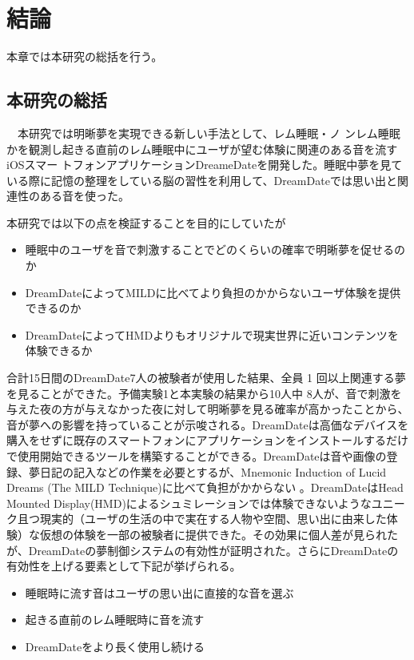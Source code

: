 \chapter{結論}
\label{chap:coding}

本章では本研究の総括を行う。
\section{本研究の総括}
　本研究では明晰夢を実現できる新しい手法として、レム睡眠・ノ ンレム睡眠かを観測し起きる直前のレム睡眠中にユーザが望む体験に関連のある音を流すiOSスマー トフォンアプリケーションDreameDateを開発した。睡眠中夢を見ている際に記憶の整理をしている脳の習性を利用して、DreamDateでは思い出と関連性のある音を使った。

本研究では以下の点を検証することを目的にしていたが
\begin{itemize}
\item 睡眠中のユーザを音で刺激することでどのくらいの確率で明晰夢を促せるのか
\item DreamDateによってMILDに比べてより負担のかからないユーザ体験を提供できるのか
\item DreamDateによってHMDよりもオリジナルで現実世界に近いコンテンツを体験できるか
\end{itemize}

合計15日間のDreamDate7人の被験者が使用した結果、全員 1 回以上関連する夢を見ることができた。予備実験1と本実験の結果から10人中 8人が、音で刺激を与えた夜の方が与えなかった夜に対して明晰夢を見る確率が高かったことから、音が夢への影響を持っていることが示唆される。DreamDateは高価なデバイスを購入をせずに既存のスマートフォンにアプリケーションをインストールするだけで使用開始できるツールを構築することができる。DreamDateは音や画像の登録、夢日記の記入などの作業を必要とするが、Mnemonic Induction of Lucid Dreams (The MILD Technique)に比べて負担がかからない\cite{LaBerge} 。DreamDateはHead Mounted Display(HMD)によるシュミレーションでは体験できないようなユニーク且つ現実的（ユーザの生活の中で実在する人物や空間、思い出に由来した体験）な仮想の体験を一部の被験者に提供できた。その効果に個人差が見られたが、DreamDateの夢制御システムの有効性が証明された。さらにDreamDateの有効性を上げる要素として下記が挙げられる。

\begin{itemize}
\item 睡眠時に流す音はユーザの思い出に直接的な音を選ぶ
\item 起きる直前のレム睡眠時に音を流す
\item DreamDateをより長く使用し続ける
\end{itemize}

